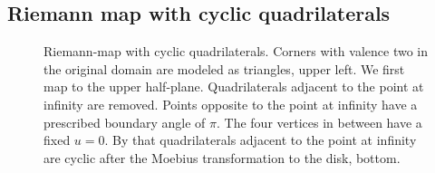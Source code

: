\documentclass[Thesis]{subfiles}
\begin{document}
\subsection{Riemann map with cyclic quadrilaterals}
\label{sec:riemann_map}

\begin{figure}
\centering
{}
\caption{
Riemann-map with cyclic quadrilaterals.
Corners with valence two in the original domain are modeled as triangles, upper left.
We first map to the upper half-plane.
Quadrilaterals adjacent to the point at infinity are removed.
Points opposite to the point at infinity have a prescribed boundary angle of $\pi$.
The four vertices in between have a fixed $u=0$.
By that quadrilaterals adjacent to the point at infinity are cyclic after the Moebius transformation to the disk, bottom.
}
\label{fig:circular_riemann}
\end{figure}
\end{document}
